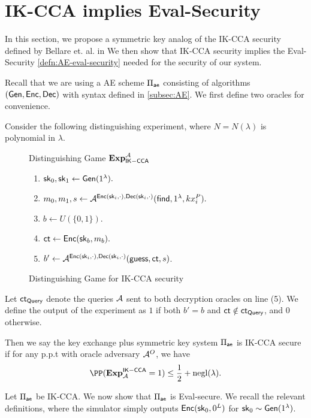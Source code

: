 \section{IK-CCA implies Eval-Security}
\label{sec:IND-CCPKA}
In this section, we propose a symmetric key analog of the IK-CCA security defined by Bellare et. al. in \cite[Definition 1]{BBDP01keyprivate}
We then show that IK-CCA security implies the Eval-Security \cref{defn:AE-eval-security} needed for the security of our system.

Recall that we are using a AE scheme $\Pi_{\mathsf{ae}}$ consisting of algorithms $(\mathsf{Gen}, \mathsf{Enc}, \mathsf{Dec})$ with syntax defined in \cref{subsec:AE}. We first define two oracles for convenience.

\begin{definition}[IK-CCA]
\label{defn:AE-IK-CCA}
Consider the following distinguishing experiment, where $N = N(\lambda)$ is polynomial in $\lambda$.
\begin{figure}[h!]
\begin{framed}
Distinguishing Game $\mathbf{Exp}_{\mathsf{IK-CCA}}^{\mathcal{A}}$
\begin{enumerate}
    \item ${\mathsf{sk}}_0, {\mathsf{sk}}_1 \leftarrow \mathsf{Gen}(1^{\lambda}).$
    \item $m_0, m_1, s \leftarrow \mathcal{A}^{\mathsf{Enc}({\mathsf{sk}}_{i}, \cdot), \mathsf{Dec}({\mathsf{sk}}_{i}, \cdot)}(\mathsf{find}, 1^{\lambda}, kx_{i}^P).$
    \item $b \leftarrow U(\{0, 1\})$.
    \item $\mathsf{ct} \leftarrow \mathsf{Enc}({\mathsf{sk}}_b, m_b).$
    \item $b' \leftarrow \mathcal{A}^{\mathsf{Enc}({\mathsf{sk}}_{i}, \cdot), \mathsf{Dec}({\mathsf{sk}}_{i}, \cdot)}(\mathsf{guess}, \mathsf{ct}, s)$.
\end{enumerate}
\end{framed}
\caption{Distinguishing Game for IK-CCA security}
\label{expr:AE-CCPKA-Distinguish}
\end{figure}

Let $\mathsf{ct}_{\mathsf{Query}}$ denote the queries $\mathcal{A}$ sent to both decryption oracles on line (5).  We define the output of the experiment as $1$ if both $b' = b$ and $\mathsf{ct} \notin \mathsf{ct}_{\mathsf{Query}}$, and $0$ otherwise. 

Then we say the key exchange plus symmetric key system $\Pi_{\mathsf{ae}}$ is IK-CCA secure if for any p.p.t with oracle adversary $\mathcal{A}^O$, we have
$$\PP(\mathbf{Exp}^{\mathsf{IK-CCA}}_{\cA} = 1) \leq \frac{1}{2} + \negl(\lambda).$$
\end{definition}

Let $\Pi_{\mathsf{ae}}$ be IK-CCA. We now show that $\Pi_{\mathsf{ae}}$ is Eval-secure. We recall the relevant definitions, where the simulator simply outputs $\mathsf{Enc}({\mathsf{sk}}_{0}, 0^{L})$ for ${\mathsf{sk}}_0 \sim \mathsf{Gen}(1^{\lambda})$.

